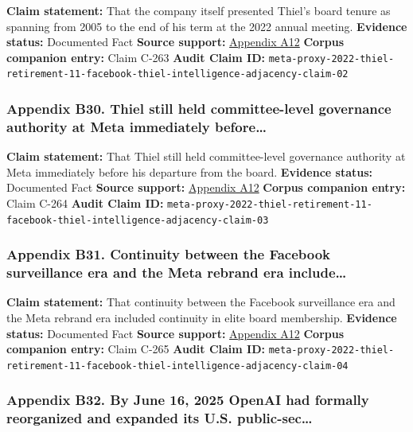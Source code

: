 \documentclass[
  american,
  11pt,
  letterpaper,
]{article}
\begin{document}
\textbf{Claim statement:} That the company itself presented Thiel's
board tenure as spanning from 2005 to the end of his term at the 2022
annual meeting. \textbf{Evidence status:} Documented Fact \textbf{Source
support:}
\hyperref[appendix-a12-meta-platforms-inc-2022-definitive-proxy-statement]{Appendix
A12} \textbf{Corpus companion entry:} Claim C-263 \textbf{Audit Claim
ID:}
\texttt{meta-proxy-2022-thiel-retirement-11-facebook-thiel-intelligence-adjacency-claim-02}

\subsubsection{Appendix B30. Thiel still held committee-level governance
authority at Meta immediately
before\ldots{}}\label{appendix-b30-thiel-still-held-committee-level-governance-authority-at-meta-immediately-before}

\textbf{Claim statement:} That Thiel still held committee-level
governance authority at Meta immediately before his departure from the
board. \textbf{Evidence status:} Documented Fact \textbf{Source
support:}
\hyperref[appendix-a12-meta-platforms-inc-2022-definitive-proxy-statement]{Appendix
A12} \textbf{Corpus companion entry:} Claim C-264 \textbf{Audit Claim
ID:}
\texttt{meta-proxy-2022-thiel-retirement-11-facebook-thiel-intelligence-adjacency-claim-03}

\subsubsection{Appendix B31. Continuity between the Facebook
surveillance era and the Meta rebrand era
include\ldots{}}\label{appendix-b31-continuity-between-the-facebook-surveillance-era-and-the-meta-rebrand-era-include}

\textbf{Claim statement:} That continuity between the Facebook
surveillance era and the Meta rebrand era included continuity in elite
board membership. \textbf{Evidence status:} Documented Fact
\textbf{Source support:}
\hyperref[appendix-a12-meta-platforms-inc-2022-definitive-proxy-statement]{Appendix
A12} \textbf{Corpus companion entry:} Claim C-265 \textbf{Audit Claim
ID:}
\texttt{meta-proxy-2022-thiel-retirement-11-facebook-thiel-intelligence-adjacency-claim-04}

\subsubsection{Appendix B32. By June 16, 2025 OpenAI had formally
reorganized and expanded its U.S.
public-sec\ldots{}}\label{appendix-b32-by-june-16-2025-openai-had-formally-reorganized-and-expanded-its-u-s-public-sec}
\end{document}

